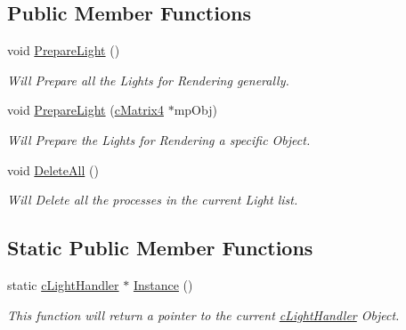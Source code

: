 \subsection*{Public Member Functions}
\begin{DoxyCompactItemize}
\item 
\hypertarget{classc_light_handler_a6961b97a431244a4494e36fe468b67fb}{
void \hyperlink{classc_light_handler_a6961b97a431244a4494e36fe468b67fb}{PrepareLight} ()}
\label{classc_light_handler_a6961b97a431244a4494e36fe468b67fb}

\begin{DoxyCompactList}\small\item\em Will Prepare all the Lights for Rendering generally. \end{DoxyCompactList}\item 
\hypertarget{classc_light_handler_af496ab1e05b26dcc1ae5da53a84da271}{
void \hyperlink{classc_light_handler_af496ab1e05b26dcc1ae5da53a84da271}{PrepareLight} (\hyperlink{classc_matrix4}{cMatrix4} $\ast$mpObj)}
\label{classc_light_handler_af496ab1e05b26dcc1ae5da53a84da271}

\begin{DoxyCompactList}\small\item\em Will Prepare the Lights for Rendering a specific Object. \end{DoxyCompactList}\item 
\hypertarget{classc_light_handler_aa3fa6f26deaa89361a703e94224bf641}{
void \hyperlink{classc_light_handler_aa3fa6f26deaa89361a703e94224bf641}{DeleteAll} ()}
\label{classc_light_handler_aa3fa6f26deaa89361a703e94224bf641}

\begin{DoxyCompactList}\small\item\em Will Delete all the processes in the current Light list. \end{DoxyCompactList}\end{DoxyCompactItemize}
\subsection*{Static Public Member Functions}
\begin{DoxyCompactItemize}
\item 
\hypertarget{classc_light_handler_a6a0f69d28ae471ebbe72ed085aec7f1e}{
static \hyperlink{classc_light_handler}{cLightHandler} $\ast$ \hyperlink{classc_light_handler_a6a0f69d28ae471ebbe72ed085aec7f1e}{Instance} ()}
\label{classc_light_handler_a6a0f69d28ae471ebbe72ed085aec7f1e}

\begin{DoxyCompactList}\small\item\em This function will return a pointer to the current \hyperlink{classc_light_handler}{cLightHandler} Object. \end{DoxyCompactList}\end{DoxyCompactItemize}


